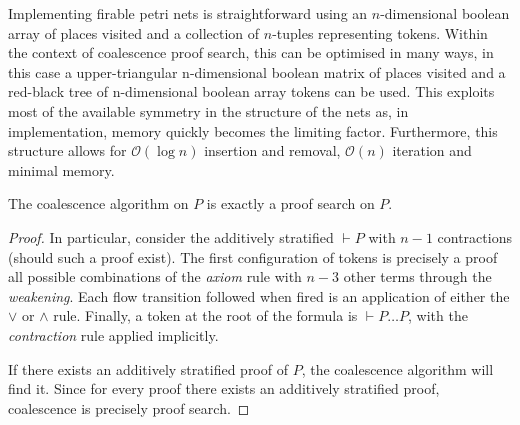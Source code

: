     \begin{remark*}
        Implementing firable petri nets is straightforward using an $n$-dimensional boolean array of places visited and a collection of $n$-tuples representing tokens.
        Within the context of coalescence proof search, this can be optimised in many ways, in this case a upper-triangular n-dimensional boolean matrix of places visited and a red-black tree of n-dimensional boolean array tokens can be used.
        This exploits most of the available symmetry in the structure of the nets as, in implementation, memory quickly becomes the limiting factor.
        Furthermore, this structure allows for $\mathcal{O}(\log{}n)$ insertion and removal, $\mathcal{O}(n)$ iteration and minimal memory.
    \end{remark*}


    \begin{proposition*}
        The coalescence algorithm on $P$ is exactly a proof search on $P$.
    \end{proposition*}

    \begin{proof}
        In particular, consider the additively stratified $\vdash P$ with $n - 1$ contractions (should such a proof exist).
        The first configuration of tokens is precisely a proof all possible combinations of the \textit{axiom} rule with $n - 3$ other terms through the \textit{weakening}.
        Each flow transition followed when fired is an application of either the $\vee$ or $\wedge$ rule.
        Finally, a token at the root of the formula is $\vdash P \ldots P$, with the \textit{contraction} rule applied implicitly.

        If there exists an additively stratified proof of $P$, the coalescence algorithm will find it.
        Since for every proof there exists an additively stratified proof, coalescence is precisely proof search.
    \end{proof}

